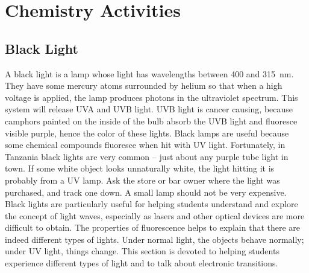 \chapter{Chemistry Activities}

\section{Black Light}

A black light is a lamp whose light has wavelengths between 400 and 315~nm. They have some mercury atoms surrounded by helium so that when a high voltage is applied, the lamp produces photons in the ultraviolet spectrum. This system will release UVA and UVB light. UVB light is cancer causing, because camphors painted on the inside of the bulb absorb the UVB light and fluoresce visible purple, hence the color of these lights. Black lamps are useful because some chemical compounds fluoresce when hit with UV light. Fortunately, in Tanzania black lights are very common -- just about any purple tube light in town. If some white object looks unnaturally white, the light hitting it is probably from a UV lamp. Ask the store or bar owner where the light was purchased, and track one down. A small lamp should not be very expensive.  Black lights are particularly useful for helping students understand and explore the concept of light waves, especially as lasers and other optical devices are more difficult to obtain. The properties of fluorescence helps to explain that there are indeed different types of lights. Under normal light, the objects behave normally; under UV light, things change. This section is devoted to helping students experience different types of light and to talk about electronic transitions.

